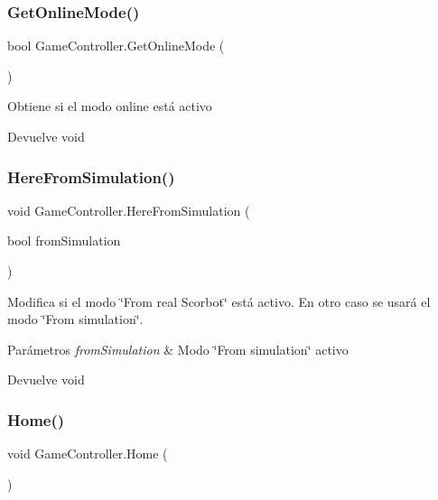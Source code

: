 \subsubsection{\texorpdfstring{GetOnlineMode()}{GetOnlineMode()}}
{\footnotesize\ttfamily bool Game\+Controller.\+Get\+Online\+Mode (\begin{DoxyParamCaption}{ }\end{DoxyParamCaption})\hspace{0.3cm}{\ttfamily [inline]}}

Obtiene si el modo online está activo \begin{DoxyReturn}{Devuelve}
void 
\end{DoxyReturn}
\mbox{\label{class_game_controller_a6ac352c2a0b3dafb1da0a71fb047736e}} 
\subsubsection{\texorpdfstring{HereFromSimulation()}{HereFromSimulation()}}
{\footnotesize\ttfamily void Game\+Controller.\+Here\+From\+Simulation (\begin{DoxyParamCaption}\item[{bool}]{from\+Simulation }\end{DoxyParamCaption})\hspace{0.3cm}{\ttfamily [inline]}}

Modifica si el modo \char`\"{}\+From real Scorbot\char`\"{} está activo. En otro caso se usará el modo \char`\"{}\+From simulation\char`\"{}. 
\begin{DoxyParams}{Parámetros}
{\em from\+Simulation} & Modo \char`\"{}\+From simulation\char`\"{} activo \\
\hline
\end{DoxyParams}
\begin{DoxyReturn}{Devuelve}
void 
\end{DoxyReturn}
\mbox{\label{class_game_controller_a92a798e28f38aa15306e58dbdef1099a}} 
\subsubsection{\texorpdfstring{Home()}{Home()}}
{\footnotesize\ttfamily void Game\+Controller.\+Home (\begin{DoxyParamCaption}{ }\end{DoxyParamCaption})\hspace{0.3cm}{\ttfamily [inline]}}

